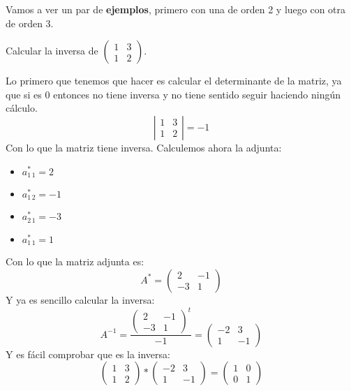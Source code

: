 \documentclass[a4paper,11pt,answers]{exam}
\newcommand\adjunto[1]{#1^\text{*}}
\begin{document}
Vamos a ver un par de \textbf{ejemplos}, primero con una de orden 2 y luego con otra de orden 3.
\begin{questions}
	\question Calcular la inversa de $\left(\begin{array}{rr}
		1&3\\
		1&2
	\end{array}\right)$.
\begin{solution}
\begin{small}
Lo primero que tenemos que hacer es calcular el determinante de la matriz, ya que si es 0 entonces no tiene inversa y no tiene sentido seguir haciendo ningún cálculo.
\[\left|\begin{array}{rr}
	1&3\\
	1&2
\end{array}\right| = -1\]
Con lo que la matriz tiene inversa. Calculemos ahora la adjunta:
\begin{itemize}
	\item $\adjunto{a_{1\,1}} = 2$
	\item $\adjunto{a_{1\,2}} = -1$
	\item $\adjunto{a_{2\,1}} = -3$
	\item $\adjunto{a_{1\,1}} = 1$
\end{itemize}
Con lo que la matriz adjunta es:
\[\adjunto{A} = \left(\begin{array}{rr}
	2&-1\\
	-3&1
\end{array}\right)\]
Y ya es sencillo calcular la inversa:
\[A^{-1} = \frac{\left(\begin{array}{rr}
		2&-1\\
		-3&1
	\end{array}\right)^t}{-1} = \left(\begin{array}{rr}
-2&3\\
1&-1
\end{array}\right)\]
Y es fácil comprobar que es la inversa:
\[\left(\begin{array}{rr}
	1&3\\
	1&2
\end{array}\right) * \left(\begin{array}{rr}
-2&3\\
1&-1
\end{array}\right) = \left(\begin{array}{rr}
1&0\\
0&1
\end{array}\right) \]
\end{small}
\end{solution}


\end{questions}
\end{document}
